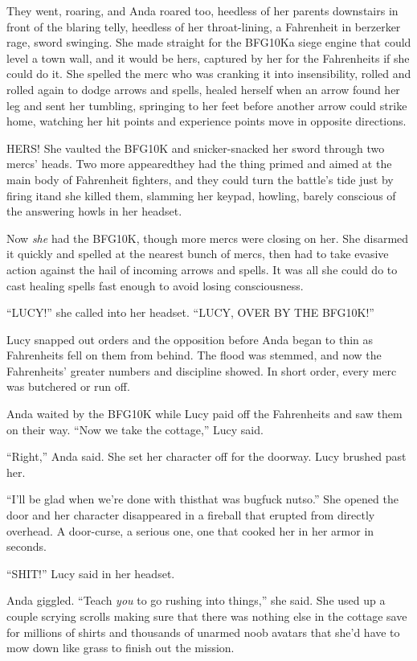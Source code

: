 They went, roaring, and Anda roared too, heedless of her parents
downstairs in front of the blaring telly, heedless of her
throat-lining, a Fahrenheit in berzerker rage, sword swinging. She
made straight for the BFG10K\dash{}a siege engine that could level a town
wall, and it would be hers, captured by her for the Fahrenheits if
she could do it. She spelled the merc who was cranking it into
insensibility, rolled and rolled again to dodge arrows and spells,
healed herself when an arrow found her leg and sent her tumbling,
springing to her feet before another arrow could strike home,
watching her hit points and experience points move in opposite
directions.

HERS! She vaulted the BFG10K and snicker-snacked her sword through
two mercs’ heads. Two more appeared\dash{}they had the thing primed and
aimed at the main body of Fahrenheit fighters, and they could turn
the battle’s tide just by firing it\dash{}and she killed them, slamming
her keypad, howling, barely conscious of the answering howls in her
headset.

Now \emph{she} had the BFG10K, though more mercs were closing on
her. She disarmed it quickly and spelled at the nearest bunch of
mercs, then had to take evasive action against the hail of incoming
arrows and spells. It was all she could do to cast healing spells
fast enough to avoid losing consciousness.

“LUCY!” she called into her headset. “LUCY, OVER BY THE BFG10K!”

Lucy snapped out orders and the opposition before Anda began to
thin as Fahrenheits fell on them from behind. The flood was
stemmed, and now the Fahrenheits’ greater numbers and discipline
showed. In short order, every merc was butchered or run off.

Anda waited by the BFG10K while Lucy paid off the Fahrenheits and
saw them on their way. “Now we take the cottage,” Lucy said.

“Right,” Anda said. She set her character off for the doorway. Lucy
brushed past her.

“I’ll be glad when we’re done with this\dash{}that was bugfuck nutso.”
She opened the door and her character disappeared in a fireball
that erupted from directly overhead. A door-curse, a serious one,
one that cooked her in her armor in seconds.

“SHIT!” Lucy said in her headset.

Anda giggled. “Teach \emph{you} to go rushing into things,” she
said. She used up a couple scrying scrolls making sure that there
was nothing else in the cottage save for millions of shirts and
thousands of unarmed noob avatars that she’d have to mow down like
grass to finish out the mission.

